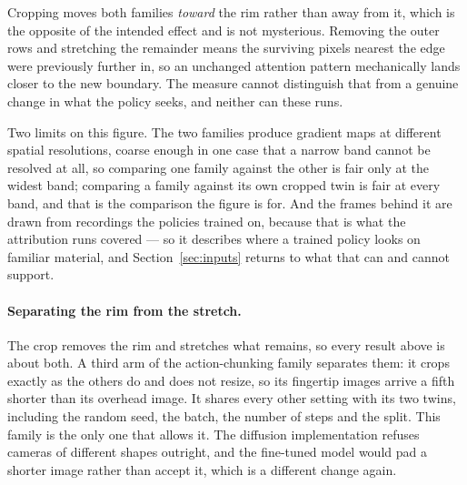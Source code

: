 Cropping moves both families \emph{toward} the rim rather than away from it,
which is the opposite of the intended effect and is not mysterious. Removing
the outer rows and stretching the remainder means the surviving pixels nearest
the edge were previously further in, so an unchanged attention pattern
mechanically lands closer to the new boundary. The measure cannot distinguish
that from a genuine change in what the policy seeks, and neither can these
runs.

Two limits on this figure. The two families produce gradient maps at different
spatial resolutions, coarse enough in one case that a narrow band cannot be
resolved at all, so comparing one family against the other is fair only at the
widest band; comparing a family against its own cropped twin is fair at every
band, and that is the comparison the figure is for. And the frames behind it
are drawn from recordings the policies trained on, because that is what the
attribution runs covered --- so it describes where a trained policy looks on
familiar material, and Section~\ref{sec:inputs} returns to what that can and
cannot support.

\paragraph{Separating the rim from the stretch.}
The crop removes the rim and stretches what remains, so every result above
is about both. A third arm of the action-chunking family separates them: it
crops exactly as the others do and does not resize, so its fingertip images
arrive a fifth shorter than its overhead image. It shares every other setting
with its two twins, including the random seed, the batch, the number of steps
and the split. This family is the only one that allows it. The diffusion
implementation refuses cameras of different shapes outright, and the
fine-tuned model would pad a shorter image rather than accept it, which is a
different change again.

\begin{table}[t]
  \centering
  \caption{Three arms of the action-chunking family that differ only in what
  is done to the fingertip images: nothing, the crop with the stretch back to
  full height, or the crop alone. Root-mean-square action error, over the
  first ten and thirty-two planned steps and over the whole hundred. Each arm
  is one training run.}
  \label{tab:stretch}
  \small
  
\end{table}

